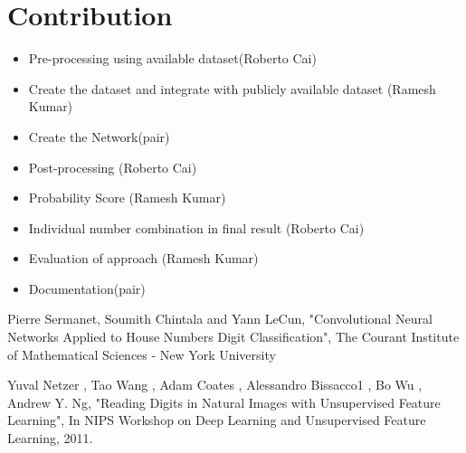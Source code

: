 \documentclass[12pt, letterpaper]{article}
\begin{document}
\section{Contribution}

\begin{itemize}
	\item Pre-processing using available dataset(Roberto Cai)
	\item Create the dataset and integrate with publicly available dataset (Ramesh Kumar)
	\item Create the Network(pair)
	\item Post-processing (Roberto Cai)
	\item Probability Score (Ramesh Kumar)
	\item Individual number combination in final result (Roberto Cai)
	\item Evaluation of approach (Ramesh Kumar)
	\item Documentation(pair)
	
\end{itemize}

\begin{thebibliography}{9}
Pierre Sermanet, Soumith Chintala and Yann LeCun, "Convolutional Neural Networks Applied to
House Numbers Digit Classification", The Courant Institute of Mathematical Sciences - New York University 


Yuval Netzer
, Tao Wang
, Adam Coates
, Alessandro Bissacco1
, Bo Wu
, Andrew Y. Ng, "Reading Digits in Natural Images
with Unsupervised Feature Learning", In NIPS Workshop on Deep
Learning and Unsupervised Feature Learning, 2011.
\end{thebibliography} 
\end{document}
